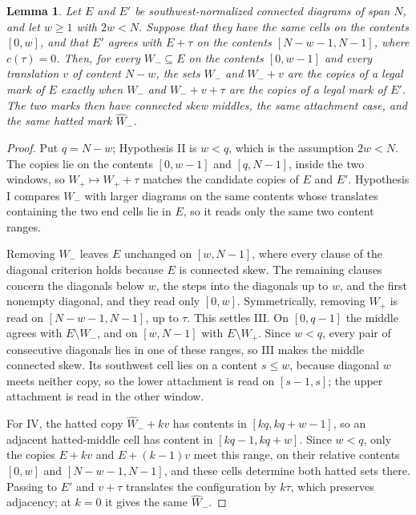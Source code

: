 \documentclass[11pt,a4paper]{amsart}
\numberwithin{equation}{section}
\theoremstyle{plain}
\newtheorem{lemma}[theorem]{Lemma}
\theoremstyle{definition}
\begin{document}
\begin{lemma}\label{lem:gluing-mark-locality}
Let \(E\) and \(E'\) be southwest-normalized connected diagrams of span \(N\), and let \(w\ge1\) with \(2w<N\).  Suppose that they have the same cells on the contents \([0,w]\), and that \(E'\) agrees with \(E+\tau\) on the contents \([N-w-1,N-1]\), where \(c(\tau)=0\).  Then, for every \(W_-\subseteq E\) on the contents \([0,w-1]\) and every translation \(v\) of content \(N-w\), the sets \(W_-\) and \(W_-+v\) are the copies of a legal mark of \(E\) exactly when \(W_-\) and \(W_-+v+\tau\) are the copies of a legal mark of \(E'\).  The two marks then have connected skew middles, the same attachment case, and the same hatted mark \(\widehat W_-\).
\end{lemma}
\begin{proof}
Put \(q=N-w\); Hypothesis II is \(w<q\), which is the assumption \(2w<N\).  The copies lie on the contents \([0,w-1]\) and \([q,N-1]\), inside the two windows, so \(W_+\mapsto W_++\tau\) matches the candidate copies of \(E\) and \(E'\).  Hypothesis I compares \(W_-\) with larger diagrams on the same contents whose translates containing the two end cells lie in \(E\), so it reads only the same two content ranges.

Removing \(W_-\) leaves \(E\) unchanged on \([w,N-1]\), where every clause of the diagonal criterion holds because \(E\) is connected skew.  The remaining clauses concern the diagonals below \(w\), the steps into the diagonals up to \(w\), and the first nonempty diagonal, and they read only \([0,w]\).  Symmetrically, removing \(W_+\) is read on \([N-w-1,N-1]\), up to \(\tau\).  This settles III.  On \([0,q-1]\) the middle agrees with \(E\setminus W_-\), and on \([w,N-1]\) with \(E\setminus W_+\).  Since \(w<q\), every pair of consecutive diagonals lies in one of these ranges, so III makes the middle connected skew.  Its southwest cell lies on a content \(s\le w\), because diagonal \(w\) meets neither copy, so the lower attachment is read on \([s-1,s]\); the upper attachment is read in the other window.

For IV, the hatted copy \(\widehat W_-+kv\) has contents in \([kq,kq+w-1]\), so an adjacent hatted-middle cell has content in \([kq-1,kq+w]\).  Since \(w<q\), only the copies \(E+kv\) and \(E+(k-1)v\) meet this range, on their relative contents \([0,w]\) and \([N-w-1,N-1]\), and these cells determine both hatted sets there.  Passing to \(E'\) and \(v+\tau\) translates the configuration by \(k\tau\), which preserves adjacency; at \(k=0\) it gives the same \(\widehat W_-\).
\end{proof}
\end{document}
